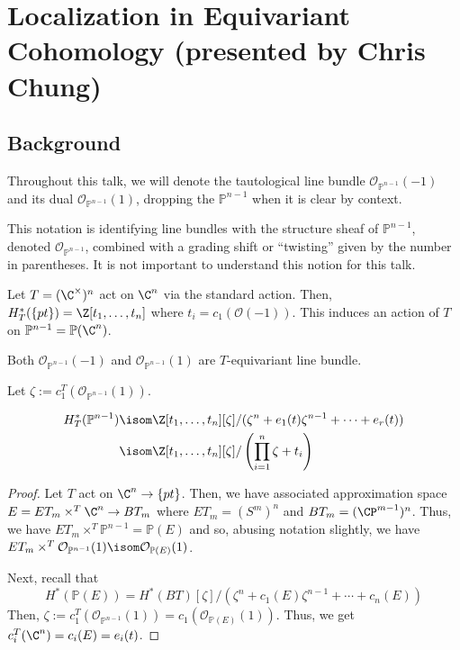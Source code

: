 \documentclass[11pt,leqno,oneside]{amsbook}
\renewcommand{\P}{\mathbb{P}}
\numberwithin{thm}{section}
\renewcommand{\O}{\mathcal{O}}
\begin{document}
\section{Localization in Equivariant Cohomology (presented by Chris
  Chung)}
\subsection{Background}
\begin{defn}
  Throughout this talk, we will denote the tautological line bundle
  \(\O_{\P^{n-1}}(-1)\) and its dual \(\O_{\P^{n-1}}(1)\), dropping
  the \(\P^{n-1}\) when it is clear by context.
\end{defn}
\begin{rmk}
  This notation is identifying line bundles with the structure sheaf
  of \(\P^{n-1}\), denoted \(\O_{\P^{n-1}}\), combined with a grading
  shift or ``twisting'' given by the number in parentheses. It is not
  important to understand this notion for this talk.
\end{rmk}
\begin{example}
  Let \(T = (\C^\times)^n\) act on \(\C^n\) via the standard
  action. Then, \(H^*_T(\{pt\}) = \Z[t_1, \ldots, t_n]\) where \(t_i =
  c_1(\O(-1))\). This induces an action of \(T\) on \(\P^{n-1} =
  \P(\C^n)\). 
\end{example}
\begin{prop}
  Both \(\O_{\P^{n-1}}(-1)\) and \(\O_{\P^{n-1}}(1)\) are
  \(T\)-equivariant line bundle.
\end{prop}
\begin{defn}
  Let \(\zeta := c_1^T(\O_{\P^{n-1}}(1))\). 
\end{defn}
\begin{prop}
  \begin{align*}
    H^*_T(\P^{n-1})
    & \isom \Z[t_1, \ldots, t_n][\zeta] / (\zeta^n + e_1(t)
      \zeta^{n-1} + \cdots + e_r(t)) \\
    & \isom \Z[t_1, \ldots, t_n][\zeta] / \left( \prod_{i=1}^n \zeta +
      t_i\right)
  \end{align*}
\end{prop}
\begin{proof}
  Let \(T\) act on \(\C^n \to \{pt\}\). Then, we have associated
  approximation space \(E = ET_m \times^T \C^n \to BT_m\) where \(ET_m
  = (S^m)^n\) and \(BT_m = (\CP^{m-1})^n\). Thus, we have \(ET_m
  \times^T \P^{n-1} = \P(E)\) and so, abusing notation slightly, we
  have \(ET_m \times^T \O_{\P^{n-1}}(1) \isom \O_{\P(E)}(1)\).

  Next, recall that \[
    H^*(\P(E)) = H^*(BT)[\zeta] / (\zeta^n + c_1(E) \zeta^{n-1} +
    \cdots + c_n(E))
  \]
  Then, \(\zeta := c_1^T(\O_{\P^{n-1}}(1)) =
  c_1(\O_{\P(E)}(1))\). Thus, we get \(c_i^T(\C^n) = c_i(E) = e_i(t)\).
\end{proof}
\end{document}
